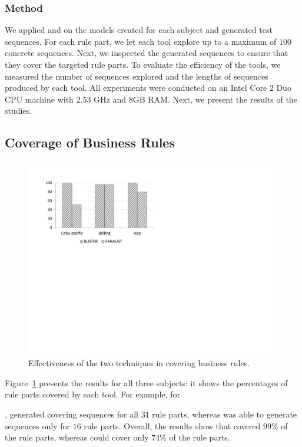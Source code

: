 \subsubsection{Method}

We applied \tool{} and \exhaust{} on the models created for each subject and
generated test sequences. For each rule part, we let each tool explore up to a
maximum of $100$ concrete sequences. Next, we inspected the generated sequences
to ensure that they cover the targeted rule parts. To evaluate the efficiency of
the tools, we measured the number of sequences explored and the lengths of
sequences produced by each tool.  All experiments were conducted on an Intel
Core 2 Duo CPU machine with 2.53 GHz and 8GB RAM. Next, we present the results
of the studies.

\subsection{Coverage of Business Rules}

\begin{figure}[t]
\centering
\includegraphics[width=0.75\columnwidth, clip, trim = 18mm 120mm 140mm
  18mm]{figs/Study-1.pdf}
\vspace*{-10pt}
\caption{Effectiveness of the two techniques in covering business rules.}
\label{fig:effectiveness}
\end{figure}

Figure~\ref{fig:effectiveness} presents the results for all three subjects: it
shows the percentages of rule parts covered by each tool. For example, for
\subject{Cebu-pacific}, \tool{} generated covering sequences for all $31$ rule
parts, whereas \exhaust{} was able to generate sequences only for $16$ rule
parts. Overall, the results show that \tool{} covered $99$\% of the rule parts,
whereas \exhaust{} could cover only $74$\% of the rule parts.

